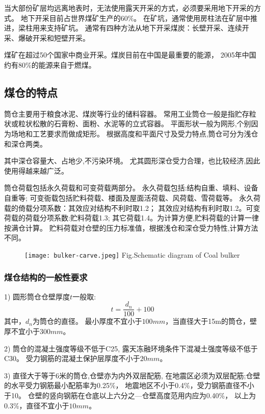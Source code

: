 当大部份矿层均远离地表时，无法使用露天开采的方式，必须要采用地下开采的方式。
地下开采目前占世界煤矿生产的$60\%$。
在矿坑，通常使用房柱法在矿层中推进，梁柱用来支持矿坑。
通常有四种方法从地下开采煤炭：长壁开采、连续开采、爆破开采和短壁开采。

煤矿在超过50个国家中商业开采。煤炭目前在中国是最重要的能源，
2005年中国约有$80\%$的能源来自于燃煤。

\subsection{煤仓的特点}
筒仓主要用于粮食冰泥、煤炭等行业的储料容器。
常用工业筒仓一般是指贮存粒状或粒状松散的石膏粉、面粉、水泥等的立式容器。
平面形状一般为网形,个别因为场地和工艺要求而做成矩形。
根据高度和平面尺寸及受力特点,筒仓可分为浅仓和深仓两类。

其中深仓容量大、占地少,不污染环境。
尤其圆形深仓受力合理，也比较经济,因此使用得越来越广泛。

筒仓荷载包括永久荷载和可变荷载两部分。
永久荷载包括:结构自重、填料、设备自重等;
可变衙载包括贮料荷载、楼面及屋面活荷载、风荷载、雪荷载等。
永久荷载的倚载分项系数：其效应对结构不利时取1.2；
其效应对结构有利时取1.2。可变荷载的荷载分项系数:贮料荷载1.3;
其它荷载1.4。为计算方便,贮料荷载的计算一律按满仓计算。
贮料荷载对仓壁的压力标准值，根据浅仓和深仓受力特性,计算方法不同。
\begin{figure}[!htbp]
   \centering
   \texttt{[image: bulker-carve.jpeg]}
								{Fig.}{Schematic diagram of Coal bulker}
\end{figure}


\subsubsection*{煤仓结构的一般性要求}
1) 圆形筒仓仓壁厚度$t$一般取:
\begin{equation}
t=\frac{d_n}{100}+100
\end{equation}
其中，$d_n$为筒仓的直径。
最小厚度不宜小于$100mm$，当直径大于15m的筒仓，壁厚不宜小于$300mm$。

2) 筒仓的混凝土强度等级不低于C25,
	露天冻融环境条件下混凝土强度等级不低于C30。
	受力钢筋的混凝土保护层厚度不小于$20mm$。

3) 直径大于等于6米的筒仓,仓壁亦为内外双层配筋,
	在地震区必须为双层配筋;仓壁的水平受力钢筋最小配筋率为0.25\%，
	地震地区不小于0.4\%，受力钢筋直径不小于10。
	仓壁的竖向钢筋在仓底以上六分之—仓壁高度范用内应为0.40\%，
	以上为0.3\%，直径不宜小于$10mm$。

